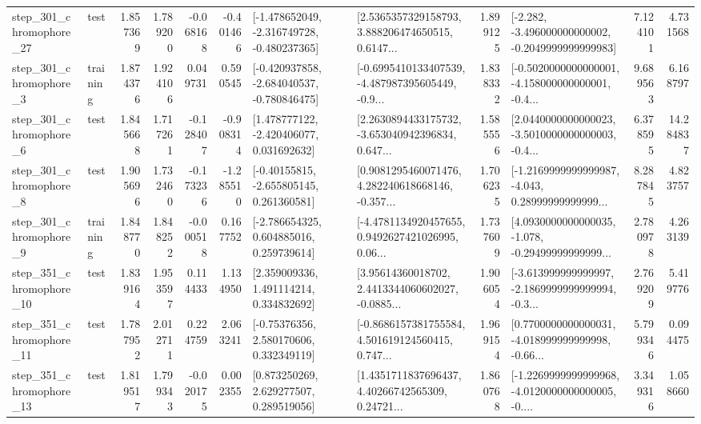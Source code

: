 \begin{tabular}{llrrrrllrlrr}
  step\_301\_chromophore\_27 &      test &      1.857369 &    1.789200 &     -0.068168 & -0.401466 &  [-1.478652049, -2.316749728, -0.480237365] &  [2.5365357329158793, 3.888206474650515, 0.6147... &       1.899125 &  [-2.282, -3.496000000000002, -0.2049999999999983] &            7.124101 &          4.731568 \\
   step\_301\_chromophore\_3 &  training &      1.874376 &    1.924106 &      0.049731 &  0.590545 &  [-0.420937858, -2.684040537, -0.780846475] &  [-0.6995410133407539, -4.487987395605449, -0.9... &       1.838332 &  [-0.5020000000000001, -4.158000000000001, -0.4... &            9.689563 &          6.168797 \\
   step\_301\_chromophore\_6 &      test &      1.845668 &    1.717261 &     -0.128407 & -0.908314 &    [1.478777122, -2.420406077, 0.031692632] &  [2.2630894433175732, -3.653040942396834, 0.647... &       1.585556 &  [2.0440000000000023, -3.5010000000000003, -0.4... &            6.378595 &         14.284837 \\
   step\_301\_chromophore\_8 &      test &      1.905696 &    1.732460 &     -0.173236 & -1.285510 &    [-0.40155815, -2.655805145, 0.261360581] &  [0.9081295460071476, 4.282240618668146, -0.357... &       1.706235 &  [-1.2169999999999987, -4.043, 0.28999999999999... &            8.287845 &          4.823757 \\
   step\_301\_chromophore\_9 &  training &      1.848770 &    1.848252 &     -0.000518 &  0.167752 &    [-2.786654325, 0.604885016, 0.259739614] &  [-4.4781134920457655, 0.9492627421026995, 0.06... &       1.737609 &  [4.0930000000000035, -1.078, -0.29499999999999... &            2.780978 &          4.263139 \\
  step\_351\_chromophore\_10 &      test &      1.839164 &    1.953597 &      0.114433 &  1.134950 &     [2.359009336, 1.491114214, 0.334832692] &  [3.95614360018702, 2.4413344060602027, -0.0885... &       1.906054 &  [-3.613999999999997, -2.1869999999999994, -0.3... &            2.769209 &          5.419776 \\
  step\_351\_chromophore\_11 &      test &      1.787952 &    2.012711 &      0.224759 &  2.063241 &     [-0.75376356, 2.580170606, 0.332349119] &  [-0.8686157381755584, 4.501619124560415, 0.747... &       1.969154 &  [0.7700000000000031, -4.018999999999998, -0.66... &            5.799346 &          0.094475 \\
  step\_351\_chromophore\_13 &      test &      1.819517 &    1.799343 &     -0.020175 &  0.002355 &     [0.873250269, 2.629277507, 0.289519056] &  [1.4351711837696437, 4.40266742565309, 0.24721... &       1.860768 &  [-1.2269999999999968, -4.0120000000000005, -0.... &            3.349316 &          1.058660 \\

\end{tabular}
